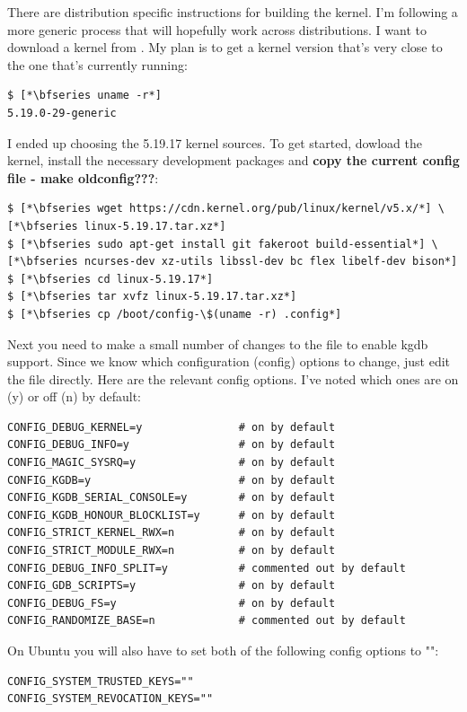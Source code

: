 There are distribution specific instructions for building the kernel. I'm following a more generic process that will hopefully work across distributions. I want to download a kernel from . My plan is to get a kernel version that's very close to the one that's currently running:

\begin{lstlisting}
$ [*\bfseries uname -r*]
5.19.0-29-generic
\end{lstlisting}

\noindent
I ended up choosing the 5.19.17 kernel sources. To get started, dowload the kernel, install the necessary development packages and \textbf{copy the current config file - make oldconfig???}:

\begin{lstlisting}
$ [*\bfseries wget https://cdn.kernel.org/pub/linux/kernel/v5.x/*] \
[*\bfseries linux-5.19.17.tar.xz*]
$ [*\bfseries sudo apt-get install git fakeroot build-essential*] \
[*\bfseries ncurses-dev xz-utils libssl-dev bc flex libelf-dev bison*]
$ [*\bfseries cd linux-5.19.17*]
$ [*\bfseries tar xvfz linux-5.19.17.tar.xz*]
$ [*\bfseries cp /boot/config-\$(uname -r) .config*]
\end{lstlisting}

\noindent
Next you need to make a small number of changes to the  file to enable kgdb support. Since we know which configuration (config) options to change, just edit the file directly. Here are the relevant config options. I've noted which ones are on (y) or off (n) by default:

\begin{lstlisting}
CONFIG_DEBUG_KERNEL=y               # on by default
CONFIG_DEBUG_INFO=y                 # on by default
CONFIG_MAGIC_SYSRQ=y                # on by default
CONFIG_KGDB=y                       # on by default
CONFIG_KGDB_SERIAL_CONSOLE=y        # on by default
CONFIG_KGDB_HONOUR_BLOCKLIST=y      # on by default
CONFIG_STRICT_KERNEL_RWX=n          # on by default 
CONFIG_STRICT_MODULE_RWX=n          # on by default  
CONFIG_DEBUG_INFO_SPLIT=y           # commented out by default
CONFIG_GDB_SCRIPTS=y                # on by default
CONFIG_DEBUG_FS=y                   # on by default
CONFIG_RANDOMIZE_BASE=n             # commented out by default
\end{lstlisting}

\noindent
On Ubuntu you will also have to set both of the following config options to "":

\begin{lstlisting}
CONFIG_SYSTEM_TRUSTED_KEYS=""
CONFIG_SYSTEM_REVOCATION_KEYS=""
\end{lstlisting}

